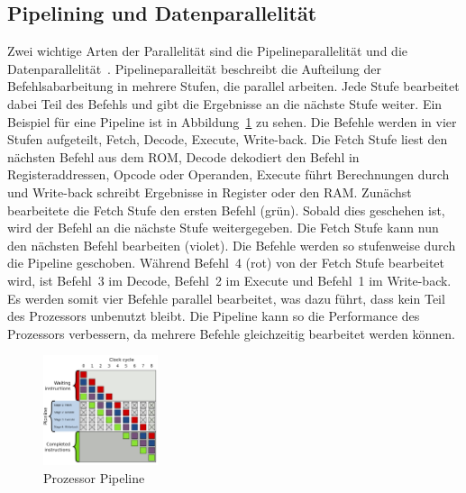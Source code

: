 \documentclass[conference]{IEEEtran}
\begin{document}



\subsection{Pipelining und Datenparallelität}
Zwei wichtige Arten der Parallelität sind die Pipelineparallelität und die Datenparallelität~\cite{istvan_glass_2019}. Pipelineparalleität beschreibt die Aufteilung der Befehlsabarbeitung
in mehrere Stufen, die parallel arbeiten. Jede Stufe bearbeitet dabei Teil des Befehls und gibt die Ergebnisse an die nächste Stufe weiter.
Ein Beispiel für eine Pipeline ist in Abbildung~\ref{fig:pipeline} zu sehen. Die Befehle werden in vier Stufen aufgeteilt, Fetch, Decode, Execute, Write-back.
Die Fetch Stufe liest den nächsten Befehl aus dem ROM, Decode dekodiert den Befehl in Registeraddressen, Opcode oder Operanden, Execute führt Berechnungen durch und
Write-back schreibt Ergebnisse in Register oder den RAM\@.
Zunächst bearbeitete die Fetch Stufe den ersten Befehl (grün). Sobald dies geschehen ist, wird der Befehl an die nächste Stufe weitergegeben. Die Fetch Stufe kann nun den nächsten Befehl
bearbeiten (violet). Die Befehle werden so stufenweise durch die Pipeline geschoben. Während Befehl~4 (rot) von der Fetch Stufe bearbeitet wird,
ist Befehl~3 im Decode, Befehl~2 im Execute und Befehl~1 im Write-back. Es werden somit vier Befehle parallel bearbeitet, was dazu führt, dass kein Teil des Prozessors
unbenutzt bleibt. Die Pipeline kann so die Performance des Prozessors verbessern, da mehrere Befehle gleichzeitig bearbeitet werden können.

\begin{figure}[b]
    \centering
    \includegraphics[width=0.3\textwidth]{imgs/pipeline.png}
    \caption{Prozessor Pipeline~\cite{wikipedia_pipeline}}\label{fig:pipeline}
\end{figure}
\end{document}
